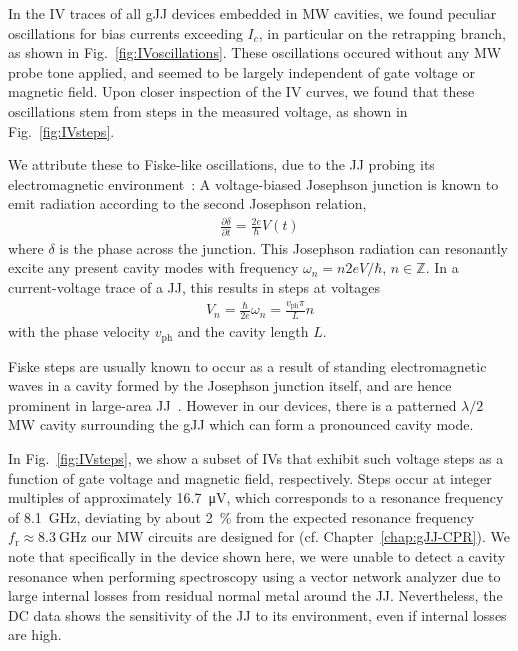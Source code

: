 In the IV traces of all gJJ devices embedded in MW cavities, we found peculiar oscillations for bias currents exceeding $I_c$, in particular on the retrapping branch, as shown in Fig.~\ref{fig:IVoscillations}.
%
These oscillations occured without any MW probe tone applied, and seemed to be largely independent of gate voltage or magnetic field.
%
Upon closer inspection of the IV curves, we found that these oscillations stem from steps in the measured voltage, as shown in Fig.~\ref{fig:IVsteps}.

We attribute these to Fiske-like oscillations, due to the JJ probing its electromagnetic environment~\cite{fiskeTemperatureMagneticField1964,eckSelfDetectionAcJosephson1964,coonJosephsonAcStep1965}:
%
A voltage-biased Josephson junction is known to emit radiation according to the second Josephson relation,
%
\begin{align}
\frac{\partial \delta}{\partial t}=\frac{2e}{\hbar}V(t)
\end{align}
%
where $\delta$ is the phase across the junction.
%
This Josephson radiation can resonantly excite any present cavity modes with frequency $\omega_n=n2eV/\hbar$, $n\in\mathbb{Z}$.
%
In a current-voltage trace of a JJ, this results in steps at voltages
%
\begin{align}
V_n=\frac{\hbar}{2e}\omega_n=\frac{v_\text{ph}\pi}{L}n
\end{align}
%
with the phase velocity $v_\text{ph}$ and the cavity length $L$.

Fiske steps are usually known to occur as a result of standing electromagnetic waves in a cavity formed by the Josephson junction itself, and are hence prominent in large-area JJ~\cite{krasnovFiskeStepsIntrinsic1999,kimFiskeStepsStudied2005,yabukiSupercurrentVanWaals2016b,liHighQualityEpitaxialMgB22017}.
%
However in our devices, there is a patterned $\lambda/2$ MW cavity surrounding the gJJ which can form a pronounced cavity mode.


In Fig.~\ref{fig:IVsteps}, we show a subset of IVs that exhibit such voltage steps as a function of gate voltage and magnetic field, respectively.
%
Steps occur at integer multiples of approximately \SI{16.7}{\micro\volt}, which corresponds to a resonance frequency of \SI{8.1}{\giga\hertz}, deviating by about \SI{2}{\percent} from the expected resonance frequency $f_\text{r}\approx\SI{8.3}{\giga\hertz}$ our MW circuits are designed for (cf. Chapter~\ref{chap:gJJ-CPR}).
%
We note that specifically in the device shown here, we were unable to detect a cavity resonance when performing spectroscopy using a vector network analyzer due to large internal losses from residual normal metal around the JJ.
%
Nevertheless, the DC data shows the sensitivity of the JJ to its environment, even if internal losses are high.

